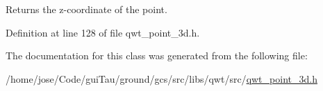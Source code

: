 Returns the z-\/coordinate of the point. 



Definition at line 128 of file qwt\-\_\-point\-\_\-3d.\-h.



The documentation for this class was generated from the following file\-:\begin{DoxyCompactItemize}
\item 
/home/jose/\-Code/gui\-Tau/ground/gcs/src/libs/qwt/src/\hyperlink{qwt__point__3d_8h}{qwt\-\_\-point\-\_\-3d.\-h}\end{DoxyCompactItemize}
